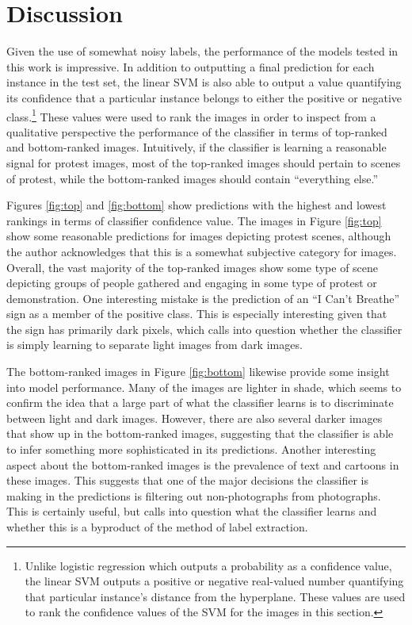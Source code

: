 \documentclass[twoside,11pt]{article}
\begin{document}
\section{Discussion}
Given the use of somewhat noisy labels, the performance of the models tested in this work is impressive. In addition to outputting a final prediction for each instance in the test set, the linear SVM is also able to output a value quantifying its confidence that a particular instance belongs to either the positive or negative class.\footnote{Unlike logistic regression which outputs a probability as a confidence value, the linear SVM outputs a positive or negative real-valued number quantifying that particular instance's distance from the hyperplane. These values are used to rank the confidence values of the SVM for the images in this section.} These values were used to rank the images in order to inspect from a qualitative perspective the performance of the classifier in terms of top-ranked and bottom-ranked images. Intuitively, if the classifier is learning a reasonable signal for protest images, most of the top-ranked images should pertain to scenes of protest, while the bottom-ranked images should contain ``everything else.''
\par
Figures \ref{fig:top} and \ref{fig:bottom} show predictions with the highest and lowest rankings in terms of classifier confidence value. The images in Figure \ref{fig:top} show some reasonable predictions for images depicting protest scenes, although the author acknowledges that this is a somewhat subjective category for images. Overall, the vast majority of the top-ranked images show some type of scene depicting groups of people gathered and engaging in some type of protest or demonstration. One interesting mistake is the prediction of an ``I Can't Breathe'' sign as a member of the positive class. This is especially interesting given that the sign has primarily dark pixels, which calls into question whether the classifier is simply learning to separate light images from dark images.
\par
The bottom-ranked images in Figure \ref{fig:bottom} likewise provide some insight into model performance. Many of the images are lighter in shade, which seems to confirm the idea that a large part of what the classifier learns is to discriminate between light and dark images. However, there are also several darker images that show up in the bottom-ranked images, suggesting that the classifier is able to infer something more sophisticated in its predictions. Another interesting aspect about the bottom-ranked images is the prevalence of text and cartoons in these images. This suggests that one of the major decisions the classifier is making in the predictions is filtering out non-photographs from photographs. This is certainly useful, but calls into question what the classifier learns and whether this is a byproduct of the method of label extraction.
\end{document}

